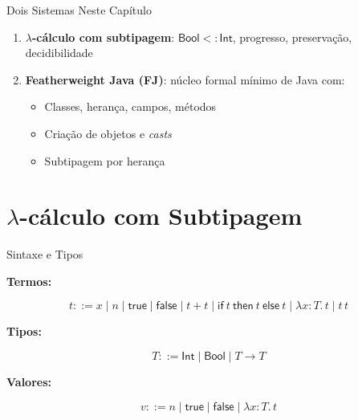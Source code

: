 \begin{frame}{Dois Sistemas Neste Capítulo}

    \begin{enumerate}
        \item
        \textbf{\(\lambda\)-cálculo com subtipagem}:
        \(\mathsf{Bool} <: \mathsf{Int}\), progresso, preservação,
        decidibilidade
        \item
        \textbf{Featherweight Java (FJ)}: núcleo formal mínimo de Java com:

        \begin{itemize}

            \item
            Classes, herança, campos, métodos
            \item
            Criação de objetos e \emph{casts}
            \item
            Subtipagem por herança
        \end{itemize}
    \end{enumerate}
\end{frame}


\section{\texorpdfstring{\(\lambda\)-cálculo com
Subtipagem}{\textbackslash lambda-cálculo com Subtipagem}}\label{lambda-cuxe1lculo-com-subtipagem}

\begin{frame}{Sintaxe e Tipos}

    \textbf{Termos:}

    \[t ::= x \mid n \mid \mathsf{true} \mid \mathsf{false} \mid t + t \mid \mathsf{if}\ t\ \mathsf{then}\ t\ \mathsf{else}\ t \mid \lambda x {:} T.\, t \mid t\, t\]

    \textbf{Tipos:}

    \[T ::= \mathsf{Int} \mid \mathsf{Bool} \mid T \to T\]

    \textbf{Valores:}

    \[v ::= n \mid \mathsf{true} \mid \mathsf{false} \mid \lambda x {:} T.\, t\]
\end{frame}

